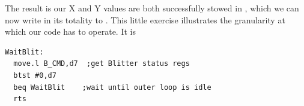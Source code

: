 \begin{figure}[H]
  {
    \setlength{\tabcolsep}{3.0pt}
    \setlength\cmidrulewidth{\lightrulewidth} %
    \begin{adjustbox}{width=3cm,center}
    \end{adjustbox}
  }
\end{figure}
\vspace{-0.5cm}
 The result is our X and Y values are both successfully stowed in , which we can now write in its totality to
. This little exercise illustrates the granularity at which our code has to operate.  It is


\begin{lstlisting}[escapechar=\%]
WaitBlit:
  move.l B_CMD,d7  ;get Blitter status regs
  btst #0,d7
  beq WaitBlit    ;wait until outer loop is idle
  rts
\end{lstlisting}
